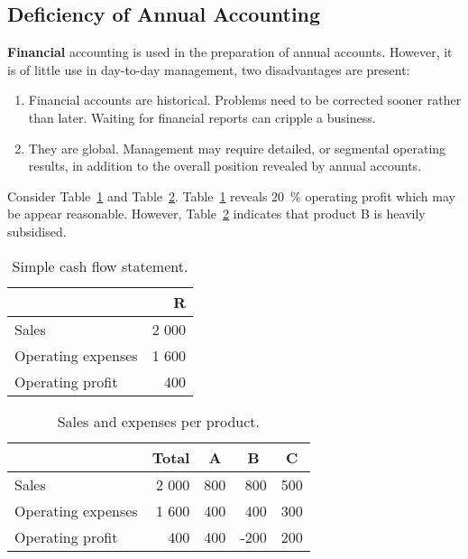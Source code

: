 \subsection{Deficiency of Annual Accounting}
\textbf{Financial }accounting is used in the preparation of annual accounts. However, it is of little use in day-to-day management, two disadvantages are present:

\begin{enumerate}
    \item Financial accounts are historical. Problems need to be corrected sooner rather than later. Waiting for financial reports can cripple a business.
    \item They are global. Management may require detailed, or segmental operating results, in addition to the overall position revealed by annual accounts.
\end{enumerate}

Consider Table~\ref{tab:simple} and Table~\ref{tab:detail}. Table~\ref{tab:simple} reveals 20~\% operating profit which may be appear reasonable. However, Table~\ref{tab:detail} indicates that product B is heavily subsidised.

\begin{table}[H]
    \centering
    \begin{tabular}{lr}
    \toprule
                            & \textbf{R} \\
    \midrule
        Sales               & 2 000 \\
        Operating expenses  & 1 600 \\
        Operating profit    &   400 \\
    \bottomrule
    \end{tabular}
    \caption{Simple cash flow statement.}
    \label{tab:simple}
\end{table}

\begin{table}[H]
    \centering
    \begin{tabular}{lrrrr}
    \toprule
    & \multicolumn{1}{c}{Total} & \multicolumn{1}{c}{A} & \multicolumn{1}{c}{B} & \multicolumn{1}{c}{C}\\
    \midrule
        Sales               & 2 000   & 800   & 800   & 500   \\
        Operating expenses  & 1 600   & 400   & 400   & 300   \\
        Operating profit    & 400     & 400   & -200  & 200   \\
    \bottomrule
    \end{tabular}
    \caption{Sales and expenses per product.}
    \label{tab:detail}
\end{table}

